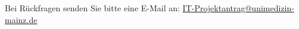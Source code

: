 \documentclass[10pt, a4paper]{article}
\begin{document}



\vspace*{1cm}
\noindent
Bei Rückfragen senden Sie bitte eine E-Mail an:
\href{mailto:IT-Projektantrag@unimedizin-mainz.de}{IT-Projektantrag@unimedizin-mainz.de}

\end{document}
